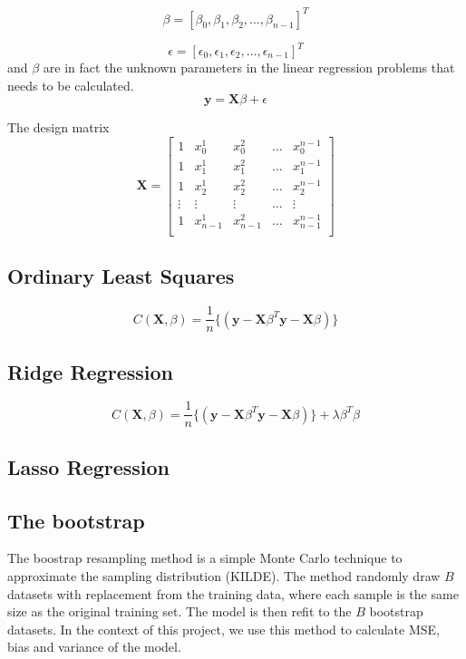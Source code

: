 \documentclass{article}
\begin{document}
\begin{equation}
\beta = [\beta_{0}, \beta_{1}, \beta_{2}, \dots, \beta_{n-1}]^{T}
\end{equation}

\begin{equation}
\epsilon = [\epsilon_{0}, \epsilon_{1}, \epsilon_{2}, \dots, \epsilon_{n-1}]^{T}
\end{equation}
and $\beta$ are in fact the unknown parameters in the linear regression problems that needs to be calculated.
\begin{equation}
\textbf{\~{y}} = \textbf{X}\beta + \epsilon
\end{equation}

The design matrix
\begin{equation} \label{designM}
\textbf{X} = 
\begin{bmatrix}
1 & x_{0}^{1} & x_{0}^{2} & \dots & x_{0}^{n-1} \\
1 & x_{1}^{1} & x_{1}^{2} & \dots & x_{1}^{n-1} \\
1 & x_{2}^{1} & x_{2}^{2} & \dots & x_{2}^{n-1} \\
\vdots & \vdots & \vdots & \dots & \vdots \\
1 & x_{n-1}^{1} & x_{n-1}^{2} & \dots & x_{n-1}^{n-1} \\ 
\end{bmatrix}
\end{equation}

\subsection{Ordinary Least Squares}
\begin{equation}
C(\textbf{X},\beta) = \dfrac{1}{n} \{( \textbf{y}-\textbf{X}\beta^{T}\textbf{y}-\textbf{X}\beta)\}
\end{equation}
\subsection{Ridge Regression}
\begin{equation}
C(\textbf{X},\beta) = \dfrac{1}{n} \{( \textbf{y}-\textbf{X}\beta^{T}\textbf{y}-\textbf{X}\beta)\} + \lambda \beta^{T} \beta 
\end{equation}
\subsection{Lasso Regression}
\subsection{The bootstrap}
The boostrap resampling method is a simple Monte Carlo technique to approximate the sampling distribution (KILDE). The method randomly draw $B$ datasets with replacement from the training data, where each sample is the same size as the original training set. The model is then refit to the $B$ bootstrap datasets. In the context of this project, we use this method to calculate MSE, bias and variance of the model.
\end{document}

